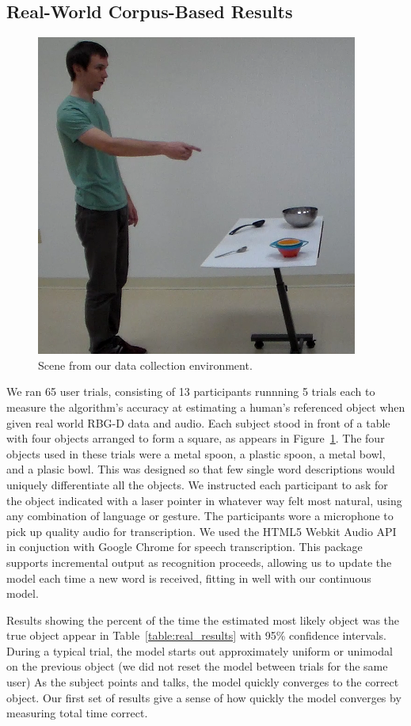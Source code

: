 \documentclass[a4paper, 11pt]{article} %
\begin{document}
\subsection{Real-World Corpus-Based Results}
\begin{figure}
\centering
\includegraphics[width=0.5\linewidth]{images/dataset.png}
\caption{Scene from our data collection environment.\label{fig:corpus_scene}}
\end{figure}

We ran 65 user trials, consisting of 13 participants runnning 5 trials each to measure the algorithm's accuracy at estimating a human's referenced object when given real world RBG-D data and audio. Each subject stood in front of a table with four objects arranged to form a square, as appears in Figure~\ref{fig:corpus_scene}. The four objects used in these trials were a metal spoon, a plastic spoon, a metal bowl, and a plasic bowl. This was designed so that few single word descriptions would uniquely differentiate all the objects. We instructed each participant to ask for the object indicated with a laser pointer in whatever way felt most natural, using any combination of language or gesture. The participants wore a microphone to pick up quality audio for transcription. We used the HTML5 Webkit Audio API in conjuction with Google Chrome for speech transcription. This package supports incremental output as recognition proceeds, allowing us to update the model each time a new word is received, fitting in well with our continuous model.

Results showing the percent of the time the estimated most likely
object was the true object appear in Table~\ref{table:real_results}
with 95\% confidence intervals.  During a typical trial, the model
starts out approximately uniform or unimodal on the previous object
(we did not reset the model between trials for the same user) As the subject points and
talks, the model quickly converges to the correct object.  Our first
set of results give a sense of how quickly the model converges by measuring total time correct.
\end{document}
